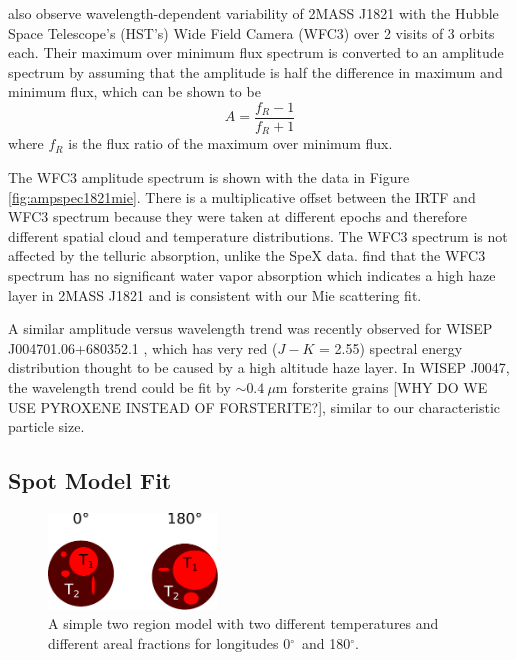 \documentclass[twocolumn]{aastex6}
\newcommand{\degree}{$^\circ$}
\begin{document}
\citet{2015ApJ...798L..13Y} also observe wavelength-dependent variability of 2MASS J1821 with the Hubble Space Telescope's (HST's) Wide Field Camera (WFC3) over 2 visits of 3 orbits each.
Their maximum over minimum flux spectrum is converted to an amplitude spectrum by assuming that the amplitude is half the difference in maximum and minimum flux, which can be shown to be 
\begin{equation}
A  = \frac{f_R - 1}{f_R + 1}
\end{equation}\label{eq:ampFromRatio}
where $f_R$ is the flux ratio of the maximum over minimum flux.

The WFC3 amplitude spectrum is shown with the data in Figure \ref{fig:ampspec1821mie}.
There is a multiplicative offset between the IRTF and WFC3 spectrum because they were taken at different epochs and therefore different spatial cloud and temperature distributions.
The WFC3 spectrum is not affected by the telluric absorption, unlike the SpeX data.
\citet{2015ApJ...798L..13Y} find that the WFC3 spectrum has no significant water vapor absorption which indicates a high haze layer in 2MASS J1821 and is consistent with our Mie scattering fit.

A similar amplitude versus wavelength trend was recently observed for WISEP J004701.06+680352.1 \citep{2016ApJ...829L..32L}, which has very red ($J-K$ = 2.55) spectral energy distribution thought to be caused by a high altitude haze layer.
In WISEP J0047, the wavelength trend could be fit by $\sim 0.4~\mu$m forsterite grains [WHY DO WE USE PYROXENE INSTEAD OF FORSTERITE?], similar to our characteristic particle size.

\subsection{Spot Model Fit}\label{sec:spotModel}

\begin{figure}
\begin{centering}
\includegraphics[width=0.4\textwidth]{temperature_drawing.pdf}
\caption{A simple two region model with two different temperatures and different areal fractions for longitudes 0\degree\ and 180\degree.}\label{fig:tdiffschem}
\end{centering}
\end{figure}
\end{document}

